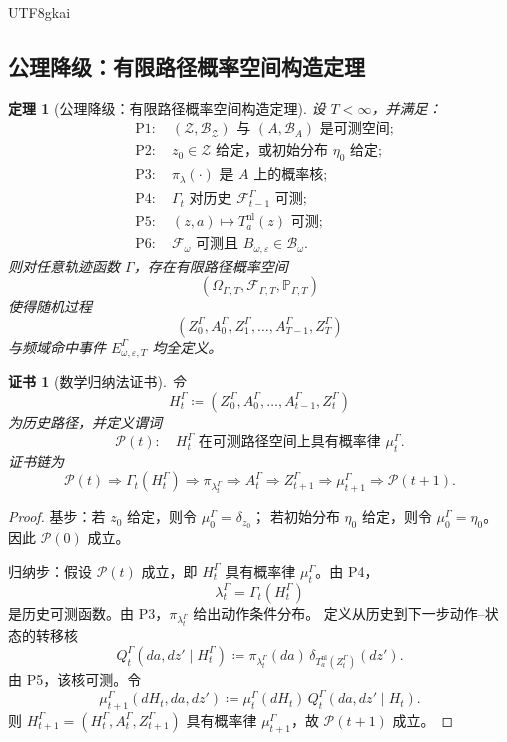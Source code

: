 \documentclass[12pt]{article}
\newtheorem{theorem}{定理}[section]
\newtheorem{Certificate}{证书}[section]
\newcommand{\DefEq}{\coloneqq}
\newcommand{\Prob}{\mathbb P}
\newcommand{\Fil}{\mathcal F}
\begin{document}
\begin{CJK*}{UTF8}{gkai}
\subsection{公理降级：有限路径概率空间构造定理}
\label{subsec:finite-path-probability-space}

\begin{theorem}[公理降级：有限路径概率空间构造定理]
设 \(T<\infty\)，并满足：
\[
\begin{aligned}
&\mathrm{P1}:\quad
(\mathcal Z,\mathscr B_{\mathcal Z})\text{ 与 }(A,\mathscr B_A)
\text{ 是可测空间};\\
&\mathrm{P2}:\quad
z_0\in\mathcal Z\text{ 给定，或初始分布 }\eta_0\text{ 给定};\\
&\mathrm{P3}:\quad
\pi_\lambda(\cdot)\text{ 是 }A\text{ 上的概率核};\\
&\mathrm{P4}:\quad
\Gamma_t\text{ 对历史 }\Fil_{t-1}^{\Gamma}\text{ 可测};\\
&\mathrm{P5}:\quad
(z,a)\mapsto T_a^{\mathrm{nl}}(z)\text{ 可测};\\
&\mathrm{P6}:\quad
\mathcal F_\omega\text{ 可测且 }B_{\omega,\varepsilon}\in\mathscr B_\omega.
\end{aligned}
\]
则对任意轨迹函数 \(\Gamma\)，存在有限路径概率空间
\[
\boxed{
(\Omega_{\Gamma,T},\mathscr F_{\Gamma,T},\Prob_{\Gamma,T})
}
\]
使得随机过程
\[
(Z_0^\Gamma,A_0^\Gamma,Z_1^\Gamma,\ldots,A_{T-1}^\Gamma,Z_T^\Gamma)
\]
与频域命中事件 \(E_{\omega,\varepsilon,T}^{\Gamma}\) 均全定义。
\end{theorem}

\begin{Certificate}[数学归纳法证书]
令
\[
H_t^\Gamma
\DefEq
(Z_0^\Gamma,A_0^\Gamma,\ldots,A_{t-1}^\Gamma,Z_t^\Gamma)
\]
为历史路径，并定义谓词
\[
\mathcal P(t):
\quad
H_t^\Gamma
\text{ 在可测路径空间上具有概率律 }\mu_t^\Gamma.
\]
证书链为
\[
\boxed{
\mathcal P(t)
\Rightarrow
\Gamma_t(H_t^\Gamma)
\Rightarrow
\pi_{\lambda_t^\Gamma}
\Rightarrow
A_t^\Gamma
\Rightarrow
Z_{t+1}^\Gamma
\Rightarrow
\mu_{t+1}^\Gamma
\Rightarrow
\mathcal P(t+1).
}
\]
\end{Certificate}

\begin{proof}
基步：若 \(z_0\) 给定，则令 \(\mu_0^\Gamma=\delta_{z_0}\)；
若初始分布 \(\eta_0\) 给定，则令 \(\mu_0^\Gamma=\eta_0\)。
因此 \(\mathcal P(0)\) 成立。

归纳步：假设 \(\mathcal P(t)\) 成立，即 \(H_t^\Gamma\) 具有概率律
\(\mu_t^\Gamma\)。由 P4，
\[
\lambda_t^\Gamma=\Gamma_t(H_t^\Gamma)
\]
是历史可测函数。由 P3，\(\pi_{\lambda_t^\Gamma}\) 给出动作条件分布。
定义从历史到下一步动作--状态的转移核
\[
Q_t^\Gamma(da,dz'\mid H_t^\Gamma)
\DefEq
\pi_{\lambda_t^\Gamma}(da)\,
\delta_{T_a^{\mathrm{nl}}(Z_t^\Gamma)}(dz').
\]
由 P5，该核可测。令
\[
\mu_{t+1}^\Gamma(dH_t,da,dz')
\DefEq
\mu_t^\Gamma(dH_t)\,
Q_t^\Gamma(da,dz'\mid H_t).
\]
则 \(H_{t+1}^\Gamma=(H_t^\Gamma,A_t^\Gamma,Z_{t+1}^\Gamma)\)
具有概率律 \(\mu_{t+1}^\Gamma\)，故 \(\mathcal P(t+1)\) 成立。


\end{proof}
\end{CJK*}
\end{document}
